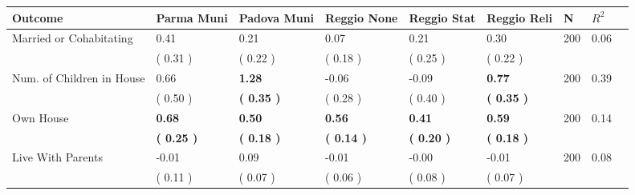 \begin{tabular}{L{6.2cm} C{1.8cm} C{1.8cm} C{1.8cm} C{1.8cm} C{1.8cm} C{1.8cm} C{0.3cm} C{0.3cm}}
\toprule
 \textbf{Outcome} & \textbf{Parma Muni} & \textbf{Padova Muni} & \textbf{Reggio None} & \textbf{Reggio Stat} & \textbf{Reggio Reli} & \textbf{N} & \textbf{$ R^2$} \\
\midrule
Married or Cohabitating &      0.41 &      0.21 &      0.07 &      0.21 &      0.30  & 200 &       0.06 \\ 
 & (     0.31 ) & (     0.22 ) & (     0.18 ) & (     0.25 ) & (     0.22 )  & \\
Num. of Children in House &      0.66 & \textbf{     1.28} &     -0.06 &     -0.09 & \textbf{     0.77}  & 200 &       0.39 \\ 
 & (     0.50 ) & \textbf{(     0.35 )} & (     0.28 ) & (     0.40 ) & \textbf{(     0.35 )}  & \\
Own House & \textbf{     0.68} & \textbf{     0.50} & \textbf{     0.56} & \textbf{     0.41} & \textbf{     0.59}  & 200 &       0.14 \\ 
 & \textbf{(     0.25 )} & \textbf{(     0.18 )} & \textbf{(     0.14 )} & \textbf{(     0.20 )} & \textbf{(     0.18 )}  & \\
Live With Parents &     -0.01 &      0.09 &     -0.01 &     -0.00 &     -0.01  & 200 &       0.08 \\ 
 & (     0.11 ) & (     0.07 ) & (     0.06 ) & (     0.08 ) & (     0.07 )  & \\
\bottomrule
\end{tabular}
